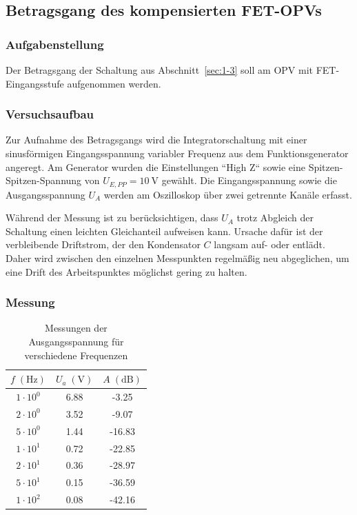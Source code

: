 \subsection{Betragsgang des kompensierten FET-OPVs}\label{sec:1-4}
\subsubsection{Aufgabenstellung}
Der Betragsgang der Schaltung aus Abschnitt~\ref{sec:1-3}
soll am OPV mit FET-Eingangsstufe aufgenommen werden.

\subsubsection{Versuchsaufbau}
Zur Aufnahme des Betragsgangs wird die Integratorschaltung mit einer sinusförmigen Eingangsspannung variabler Frequenz aus dem Funktionsgenerator angeregt. Am Generator wurden die Einstellungen ``High Z`` sowie eine Spitzen-Spitzen-Spannung von $U_{E,PP} = \SI{10}{\volt}$ gewählt. Die Eingangsspannung sowie die Ausgangsspannung $U_A$ werden am Oszilloskop über zwei getrennte Kanäle erfasst.

Während der Messung ist zu berücksichtigen, dass $U_A$ trotz Abgleich der Schaltung einen leichten Gleichanteil aufweisen kann. Ursache dafür ist der verbleibende Driftstrom, der den Kondensator $C$ langsam auf- oder entlädt. Daher wird zwischen den einzelnen Messpunkten regelmäßig neu abgeglichen, um eine Drift des Arbeitspunktes möglichst gering zu halten.

\subsubsection{Messung}

\begin{table}[h]
	\centering
	\begin{tabular}{c|c|c}
		$f \; (\mathrm{Hz})$ & $U_a \; (\mathrm{V})$ & $A \; (\mathrm{dB})$ \\
		\hline
		$1 \cdot 10^{0}$     & 6.88                  & -3.25                \\
		$2 \cdot 10^{0}$     & 3.52                  & -9.07                \\
		$5 \cdot 10^{0}$     & 1.44                  & -16.83               \\
		$1 \cdot 10^{1}$     & 0.72                  & -22.85               \\
		$2 \cdot 10^{1}$     & 0.36                  & -28.97               \\
		$5 \cdot 10^{1}$     & 0.15                  & -36.59               \\
		$1 \cdot 10^{2}$     & 0.08                  & -42.16               \\
	\end{tabular}
	\caption{Messungen der Ausgangsspannung für verschiedene Frequenzen}\label{tab:14-ua-fuer-frequenzen}
\end{table}

